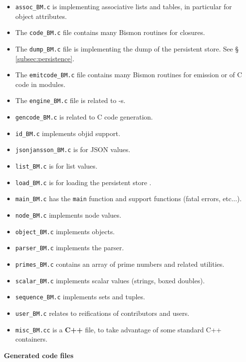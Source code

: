 \begin{itemize}
  \item \texttt{assoc\_BM.c} is implementing associative lists and
    tables,    in
    particular for object attributes.

  \item The \texttt{code\_BM.c} file contains many Bismon routines for
     closures.

  \item The \texttt{dump\_BM.c} file is implementing the  dump of the
      persistent store.   See \S
      \ref{subsec:persistence}.

  \item The \texttt{emitcode\_BM.c} file contains many Bismon routines
    for  emission or  of C code in
     modules.
  \item The \texttt{engine\_BM.c} file is related to -s.

  \item \texttt{gencode\_BM.c} is related to C code generation.

  \item \texttt{id\_BM.c} implements objid support.

  \item \texttt{jsonjansson\_BM.c} is for JSON values.

  \item \texttt{list\_BM.c} is for list values.

  \item \texttt{load\_BM.c} is for loading the persistent store
   .

  \item \texttt{main\_BM.c} has the \texttt{main} function and support functions (fatal errors, etc...).

  \item \texttt{node\_BM.c} implements node values.

  \item \texttt{object\_BM.c} implements objects.

  \item \texttt{parser\_BM.c} implements the parser.

  \item \texttt{primes\_BM.c} contains an array of prime numbers and related utilities.

  \item \texttt{scalar\_BM.c} implements scalar values (strings, boxed doubles).

  \item \texttt{sequence\_BM.c} implements sets and tuples.

  \item \texttt{user\_BM.c} relates to reifications of contributors and
  users.

  \item \texttt{misc\_BM.cc} is a \textbf{C++} file, to take advantage of some standard C++ containers.
\end{itemize}

{\large \textbf{Generated  code files}}
